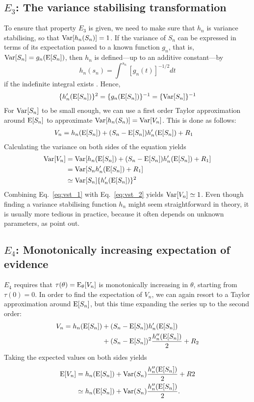 \subsection{\texorpdfstring{$E_3$}{E3}: The variance stabilising transformation}
\label{subsec:vst}
To ensure that property $E_3$ is given, we need to make sure that $h_n$ is variance stabilising, so that $\operatorname{\text{Var}}[h_n(S_n)]=1$. If the variance of $S_n$ can be expressed in terms of its expectation passed to a known function $g_n$, that is, ${\operatorname{\text{Var}}[S_n] = g_n(\operatorname{\text{E}}[S_n])}$, then $h_n$ is defined---up to an additive constant---by
$$h_n(s_n) = \int^{s_n}[g_n(t)]^{-1/2}dt$$
if the indefinite integral exists \citep[p.~126--127]{kulinskaya_meta_2008}. Hence,
\begin{align}
    \{h_n'(\operatorname{\text{E}}[S_n])\}^2 = \{g_n(\operatorname{\text{E}}[S_n])\}^{-1} = \{\operatorname{\text{Var}}[S_n]\}^{-1} \label{eq:vst_1}
\end{align}
For $\operatorname{\text{Var}}[S_n]$ to be small enough, we can use a first order Taylor approximation around $\operatorname{\text{E}}[S_n]$ to approximate ${\operatorname{\text{Var}}[h_n(S_n)] = \operatorname{\text{Var}}[V_n]}$. This is done as follows:
\begin{align*}
    V_n &= h_n(\operatorname{\text{E}}[S_n]) + (S_n-\operatorname{\text{E}}[S_n])h_n'(\operatorname{\text{E}}[S_n])+R_1
\end{align*}
Calculating the variance on both sides of the equation yields
\begin{align}
    \operatorname{\text{Var}}[V_n] &= \operatorname{\text{Var}}[h_n(\operatorname{\text{E}}[S_n]) + (S_n-\operatorname{\text{E}}[S_n])h_n'(\operatorname{\text{E}}[S_n])+R_1] \nonumber \\
    &= \operatorname{\text{Var}}[S_n h_n'(\operatorname{\text{E}}[S_n])+R_1]  \nonumber \\
    &\simeq \operatorname{\text{Var}}[S_n]\{h_n'(\operatorname{\text{E}}[S_n])\}^2 \label{eq:vst_2}
\end{align}
Combining Eq.~\ref{eq:vst_1} with Eq.~\ref{eq:vst_2} yields $\operatorname{\text{Var}}[V_n] \simeq 1$. Even though finding a variance stabilising function $h_n$ might seem straightforward in theory, it is usually more tedious in practice, because it often depends on unknown parameters, as \citet[p.~127]{kulinskaya_meta_2008} point out.

\subsection{\texorpdfstring{$E_4$}{E4}: Monotonically increasing expectation of evidence}
\label{subsec:monotone_expect_ev}
$E_4$ requires that $\tau(\theta) = \operatorname{\text{E}}_{\theta}[V_n]$ is monotonically increasing in $\theta$, starting from $\tau(0) = 0$. In order to find the expectation of $V_n$, we can again resort to a Taylor approximation around $\operatorname{\text{E}}[S_n]$, but this time expanding the series up to the second order:
\begin{align*}
    V_n = h_n(\operatorname{\text{E}}[S_n]) &+ (S_n-\operatorname{\text{E}}[S_n])h_n'(\operatorname{\text{E}}[S_n])\\ 
    &+ (S_n-\operatorname{\text{E}}[S_n])^2\frac{h_n''(\operatorname{\text{E}}[S_n])}{2}+R_2\\
\end{align*}
Taking the expected values on both sides yields
\begin{align*}
    \operatorname{\text{E}}[V_n] &= h_n(\operatorname{\text{E}}[S_n])+\operatorname{\text{Var}}(S_n)\frac{h_n''(\operatorname{\text{E}}[S_n])}{2} + R2 \\
    &\simeq h_n(\operatorname{\text{E}}[S_n])+\operatorname{\text{Var}}(S_n)\frac{h_n''(\operatorname{\text{E}}[S_n])}{2}.
\end{align*}

